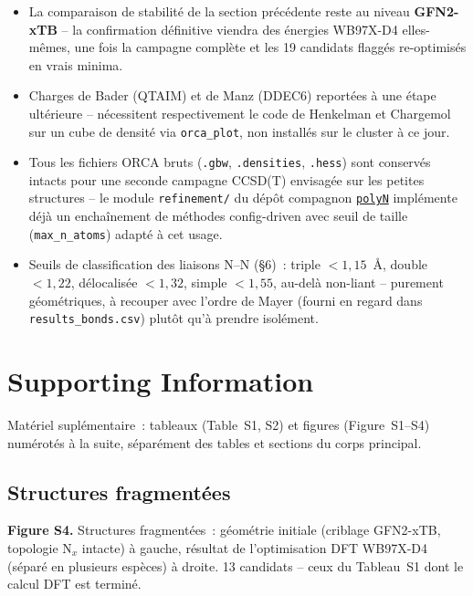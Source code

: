 \documentclass[11pt,a4paper]{article}
\begin{document}
\begin{itemize}[leftmargin=1.4em]
  \item La comparaison de stabilit\'e de la section pr\'ec\'edente reste
  au niveau \textbf{GFN2-xTB} -- la confirmation d\'efinitive viendra des
  \'energies WB97X-D4 elles-m\^emes, une fois la campagne compl\`ete et les
  19 candidats flagg\'es re-optimis\'es en vrais minima.
  \item Charges de Bader (QTAIM) et de Manz (DDEC6) report\'ees \`a une
  \'etape ult\'erieure -- n\'ecessitent respectivement le code de
  Henkelman et Chargemol sur un cube de densit\'e via \texttt{orca\_plot},
  non install\'es sur le cluster \`a ce jour.
  \item Tous les fichiers ORCA bruts (\texttt{.gbw}, \texttt{.densities},
  \texttt{.hess}) sont conserv\'es intacts pour une seconde campagne
  CCSD(T) envisag\'ee sur les petites structures -- le module
  \texttt{refinement/} du d\'ep\^ot compagnon
  \href{https://github.com/John-Akapulco/polyN}{\texttt{polyN}} impl\'emente
  d\'ej\`a un enchaînement de m\'ethodes config-driven avec seuil de taille
  (\texttt{max\_n\_atoms}) adapt\'e \`a cet usage.
  \item Seuils de classification des liaisons N--N (\S6)~: triple
  $<1{,}15$~\AA, double $<1{,}22$, d\'elocalis\'ee $<1{,}32$, simple
  $<1{,}55$, au-del\`a non-liant -- purement g\'eom\'etriques, \`a
  recouper avec l'ordre de Mayer (fourni en regard dans
  \texttt{results\_bonds.csv}) plut\^ot qu'\`a prendre isol\'ement.
\end{itemize}

\clearpage
\appendix
\renewcommand{\thesection}{\Alph{section}}
\section{Supporting Information}

Mat\'eriel supl\'ementaire~: tableaux (Table~S1, S2) et figures
(Figure~S1--S4) num\'erot\'es \`a la suite, s\'epar\'ement des tables et
sections du corps principal.

\subsection{Structures fragment\'ees}
\label{sec:si-fragmented}



\bigskip
\noindent\textbf{Figure S4.} Structures fragment\'ees~: g\'eom\'etrie
initiale (criblage GFN2-xTB, topologie N$_x$ intacte) \`a gauche,
r\'esultat de l'optimisation DFT WB97X-D4 (s\'epar\'e en plusieurs
esp\`eces) \`a droite. 13 candidats -- ceux du Tableau~S1 dont le calcul
DFT est termin\'e.
\end{document}
